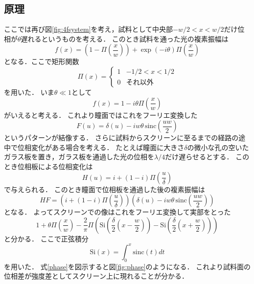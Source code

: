 \documentclass[titlepage]{jsarticle}
\begin{document}
\subsection{原理}
ここでは再び図\ref{fig:4fsystem}を考え，試料として中央部$-w/2<x<w/2$だけ位相が$\theta$遅れるというものを考える．
このとき試料を通った光の複素振幅は
\begin{equation}
    f(x) = \left(1-\Pi \left(\frac{x}{w}\right) \right) + \exp (-i\theta) \Pi \left(\frac{x}{w}\right)
\end{equation}
となる．ここで矩形関数
\begin{equation}
    \Pi \left(x\right) =
    \left\{ 
    \begin{array}{ll}
        1 & -1/2 < x < 1/2\\
        0 & \text{それ以外}
    \end{array}
    \right.
\end{equation}
を用いた．
いま$\theta \ll 1$として
\begin{equation}
    f(x) = 1 - i\theta \Pi \left(\frac{x}{w}\right)
\end{equation}
がいえると考える．
これより瞳面ではこれをフーリエ変換した
\begin{equation}
    F(u) = \delta (u) - iw\theta \,\mathrm{sinc}\left(\frac{uw}{2}\right) 
\end{equation}
というパターンが結像する．
さらに試料からスクリーンに至るまでの経路の途中で位相変化がある場合を考える．
たとえば瞳面に大きさ$\delta$の微小な孔の空いたガラス板を置き，ガラス板を通過した光の位相を$\lambda/4$だけ遅らせるとする．
このとき位相板による位相変化は
\begin{equation}
    H(u) = i + (1-i)\Pi \left(\frac{u}{\delta}\right)
\end{equation}
で与えられる．
このとき瞳面で位相板を通過した後の複素振幅は
\begin{equation}
    HF = \left(i + (1-i)\Pi \left(\frac{u}{\delta}\right)\right)\left(\delta (u) - iw\theta \,\mathrm{sinc}\left(\frac{uw}{2}\right)\right)
\end{equation}
となる．
よってスクリーンでの像はこれをフーリエ変換して実部をとった
\begin{equation}
    1 + \theta \Pi\left(\frac{x}{w}\right) - \frac{2}{\pi}\Pi\left(\mathrm{Si}\left(\frac{\delta}{2}\left(x - \frac{w}{2}\right)\right) - \mathrm{Si}\left(\frac{\delta}{2}\left(x + \frac{w}{2}\right)\right)\right)
    \label{phase}
\end{equation}
と分かる．
ここで正弦積分
\begin{equation}
    \mathrm{Si}(x) = \int_0^x \mathrm{sinc}(t) dt
\end{equation}
を用いた．
式\eqref{phase}を図示すると図\ref{fig:phase}のようになる．
これより試料面の位相差が強度差としてスクリーン上に現れることが分かる．
\end{document}
